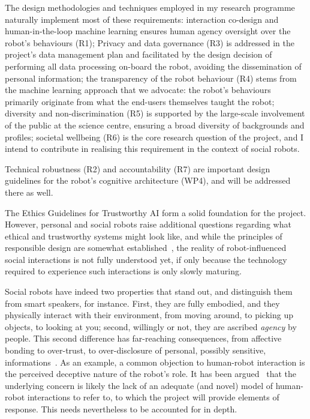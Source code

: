 The design methodologies and techniques employed in my research programme naturally implement
most of these requirements: interaction co-design and human-in-the-loop machine
learning ensures human agency oversight over the robot's behaviours (R1);
Privacy and data governance (R3) is addressed in the project's data management
plan and facilitated by the design decision of performing all data processing
on-board the robot, avoiding the dissemination of personal information; the
transparency of the robot behaviour (R4) stems from the machine learning
approach that we advocate: the robot's behaviours primarily originate from what
the end-users themselves taught the robot; diversity and non-discrimination (R5)
is supported by the large-scale involvement of the public at the science centre,
ensuring a broad diversity of backgrounds and profiles; societal wellbeing (R6)
is the core research question of the project, and I intend to contribute in
realising this requirement in the context of social robots.

Technical robustness (R2) and accountability (R7) are important design
guidelines for the robot's cognitive architecture (WP4), and will be addressed
there as well.


The Ethics Guidelines for Trustworthy AI form a solid foundation for the
project. However, personal and social robots raise additional questions
regarding what ethical and trustworthy systems might look like, and while the
principles of responsible design are somewhat established~\parencite{stahl2016ethics,
bsi2016robots}, the reality of robot-influenced social interactions is not
fully understood yet, if only because the technology required to experience such
interactions is only slowly maturing. 

Social robots have indeed two properties that stand out, and distinguish them
from smart speakers, for instance.  First, they are fully embodied, and they
physically interact with their environment, from moving around, to picking up
objects, to looking at you; second, willingly or not, they are ascribed
\emph{agency} by people. This second difference has far-reaching consequences,
from affective bonding to over-trust, to over-disclosure of personal, possibly
sensitive, informations~\parencite{martelaro2016tell,shiomi2017robot}.  As an
example, a common objection to human-robot interaction is the perceived
deceptive nature of the robot's role. It has been
argued~\parencite{biscontilucidi2018companion} that the underlying concern is likely
the lack of an adequate (and novel) model of human-robot interactions to refer
to, to which the project will provide elements of response. This needs
nevertheless to be accounted for in depth.

